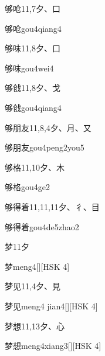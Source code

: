 \begin{entry}{够呛}{11,7}{⼣、⼝}
  \begin{phonetics}{够呛}{gou4qiang4}
  \end{phonetics}
\end{entry}

\begin{entry}{够味}{11,8}{⼣、⼝}
  \begin{phonetics}{够味}{gou4wei4}
  \end{phonetics}
\end{entry}

\begin{entry}{够戗}{11,8}{⼣、⼽}
  \begin{phonetics}{够戗}{gou4qiang4}
  \end{phonetics}
\end{entry}

\begin{entry}{够朋友}{11,8,4}{⼣、⽉、⼜}
  \begin{phonetics}{够朋友}{gou4peng2you5}
  \end{phonetics}
\end{entry}

\begin{entry}{够格}{11,10}{⼣、⽊}
  \begin{phonetics}{够格}{gou4ge2}
  \end{phonetics}
\end{entry}

\begin{entry}{够得着}{11,11,11}{⼣、⼻、⽬}
  \begin{phonetics}{够得着}{gou4de5zhao2}
  \end{phonetics}
\end{entry}

\begin{entry}{梦}{11}{⼣}
  \begin{phonetics}{梦}{meng4}[][HSK 4]
  \end{phonetics}
\end{entry}

\begin{entry}{梦见}{11,4}{⼣、⾒}
  \begin{phonetics}{梦见}{meng4 jian4}[][HSK 4]
  \end{phonetics}
\end{entry}

\begin{entry}{梦想}{11,13}{⼣、⼼}
  \begin{phonetics}{梦想}{meng4xiang3}[][HSK 4]
  \end{phonetics}
\end{entry}


